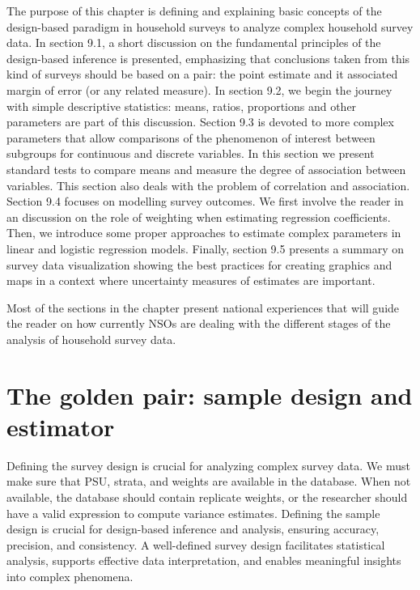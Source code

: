 \documentclass[
  12pt,
]{book}
\begin{document}
The purpose of this chapter is defining and explaining basic concepts of the design-based paradigm in household surveys to analyze complex household survey data. In section 9.1, a short discussion on the fundamental principles of the design-based inference is presented, emphasizing that conclusions taken from this kind of surveys should be based on a pair: the point estimate and it associated margin of error (or any related measure). In section 9.2, we begin the journey with simple descriptive statistics: means, ratios, proportions and other parameters are part of this discussion. Section 9.3 is devoted to more complex parameters that allow comparisons of the phenomenon of interest between subgroups for continuous and discrete variables. In this section we present standard tests to compare means and measure the degree of association between variables. This section also deals with the problem of correlation and association. Section 9.4 focuses on modelling survey outcomes. We first involve the reader in an discussion on the role of weighting when estimating regression coefficients. Then, we introduce some proper approaches to estimate complex parameters in linear and logistic regression models. Finally, section 9.5 presents a summary on survey data visualization showing the best practices for creating graphics and maps in a context where uncertainty measures of estimates are important.

Most of the sections in the chapter present national experiences that will guide the reader on how currently NSOs are dealing with the different stages of the analysis of household survey data.

\hypertarget{the-golden-pair-sample-design-and-estimator}{%
\chapter{The golden pair: sample design and estimator}\label{the-golden-pair-sample-design-and-estimator}}

Defining the survey design is crucial for analyzing complex survey data. We must make sure that PSU, strata, and weights are available in the database. When not available, the database should contain replicate weights, or the researcher should have a valid expression to compute variance estimates. Defining the sample design is crucial for design-based inference and analysis, ensuring accuracy, precision, and consistency. A well-defined survey design facilitates statistical analysis, supports effective data interpretation, and enables meaningful insights into complex phenomena.
\end{document}
